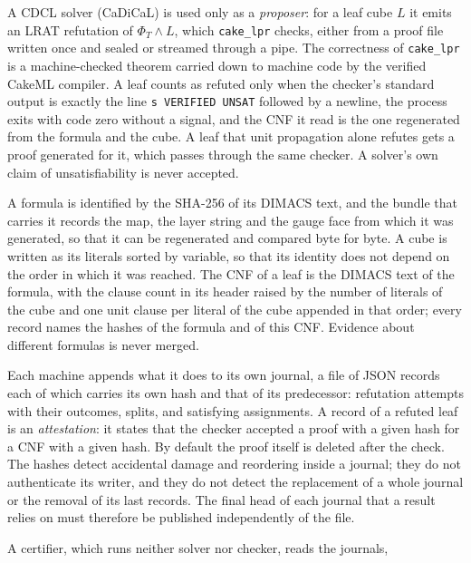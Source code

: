 \documentclass[11pt,reqno]{amsart}
\theoremstyle{plain}
\theoremstyle{definition}
\begin{document}
\begin{description}[leftmargin=1.6em,style=nextline]
\item[Two programs, one of them trusted] A CDCL solver (CaDiCaL) is used only as a \emph{proposer}:
  for a leaf cube $L$ it emits an LRAT refutation of $\Phi_T\wedge L$, which \texttt{cake\_lpr}
  \cite{TanHeuleMyreen2023} checks, either from a proof file written once and sealed or streamed
  through a pipe. The correctness of \texttt{cake\_lpr} is a machine-checked theorem carried down to
  machine code by the verified CakeML compiler. A leaf counts as refuted only when the checker's
  standard output is exactly the line \texttt{s VERIFIED UNSAT} followed by a newline,
  the process exits with code zero without a signal, and the CNF it
  read is the one regenerated from the formula and the cube. A leaf that unit propagation alone
  refutes gets a proof generated for it, which passes through the same checker. A solver's own
  claim of unsatisfiability is never accepted.
\item[Identity of the object] A formula is identified by the SHA-256 of its DIMACS text, and the
  bundle that carries it records the map, the layer string and the gauge face from which it was
  generated, so that it can be regenerated and compared byte for byte. A cube is written as its
  literals sorted by variable, so that its identity does not depend on the order in which it was
  reached. The CNF of a leaf is the DIMACS text of the formula, with the clause count in its header
  raised by the number of literals of the cube and one unit clause per literal of the cube appended
  in that order; every record names the hashes of the formula and of this CNF. Evidence about
  different formulas is never merged.
\item[Attestation] Each machine appends what it does to its own journal, a file of JSON records each
  of which carries its own hash and that of its predecessor: refutation attempts with their
  outcomes, splits, and satisfying assignments. A record of a refuted leaf is an
  \emph{attestation}: it states that the checker accepted a proof with a given hash for a CNF with
  a given hash. By default the proof itself is deleted after the check. The hashes detect
  accidental damage and reordering inside a journal; they do not authenticate its writer, and they
  do not detect the replacement of a whole journal or the removal of its last records. The final
  head of each journal that a result relies on must therefore be published independently of the
  file.
\item[Certification] A certifier, which runs neither solver nor checker, reads the journals,

\end{description}
\end{document}
